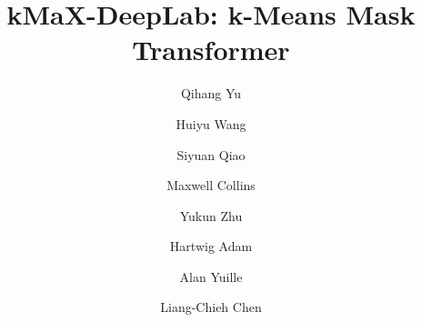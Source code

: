 \documentclass[runningheads]{llncs}
\begin{document}
\pagestyle{headings}
\mainmatter


\title{kMaX-DeepLab: k-Means Mask Transformer}

\begin{comment}
\titlerunning{ECCV-22 submission ID \ECCVSubNumber} 
\authorrunning{ECCV-22 submission ID \ECCVSubNumber} 
\author{Anonymous ECCV submission}
\institute{Paper ID \ECCVSubNumber}
\end{comment}


\author{Qihang Yu \and
Huiyu Wang \and
Siyuan Qiao \and
Maxwell Collins \and
Yukun Zhu \and
Hartwig Adam \and
Alan Yuille \and
Liang-Chieh Chen}
\maketitle
\end{document}
